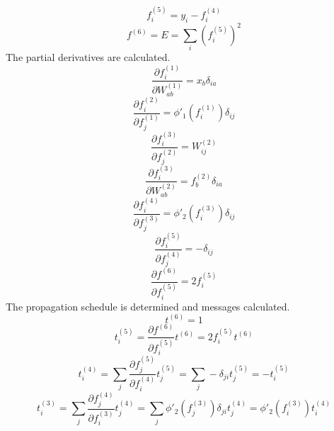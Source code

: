 \documentclass[fleqn]{article}
\begin{document}
\begin{equation}
    f^{(5)}_i = y_i - f^{(4)}_i
\end{equation}
\begin{equation}
    f^{(6)} = E = \sum_i \left ( f^{(5)}_i \right )^2
\end{equation}
The partial derivatives are calculated.
\begin{equation}
    \frac{\partial f^{(1)}_i}{\partial W^{(1)}_{ab}} = x_b \delta_{ia}
\end{equation}
\begin{equation}
    \frac{\partial f^{(2)}_i}{\partial f^{(1)}_j} = \phi'_1 \left ( f^{(1)}_i \right ) \delta_{ij}
\end{equation}
\begin{equation}
    \frac{\partial f^{(3)}_i}{\partial f^{(2)}_j} = W^{(2)}_{ij}
\end{equation}
\begin{equation}
    \frac{\partial f^{(3)}_i}{\partial W^{(2)}_{ab}} = f^{(2)}_b \delta_{ia}
\end{equation}
\begin{equation}
    \frac{\partial f^{(4)}_i}{\partial f^{(3)}_j} = \phi'_2 \left ( f^{(3)}_i \right ) \delta_{ij}
\end{equation}
\begin{equation}
    \frac{\partial f^{(5)}_i}{\partial f^{(4)}_j} = - \delta_{ij}
\end{equation}
\begin{equation}
    \frac{\partial f^{(6)}}{\partial f^{(5)}_i} = 2 f^{(5)}_i
\end{equation}
The propagation schedule is determined and messages calculated.
\begin{equation}
    t^{(6)} = 1
\end{equation}
\begin{equation}
    t^{(5)}_i = \frac{\partial f^{(6)}}{\partial f^{(5)}_i} t^{(6)} = 2 f^{(5)}_i t^{(6)}
\end{equation}
\begin{equation}
    t^{(4)}_i = \sum_j \frac{\partial f^{(5)}_j}{\partial f^{(4)}_i} t^{(5)}_j = \sum_j - \delta_{ji} t^{(5)}_j = - t^{(5)}_i
\end{equation}
\begin{equation}
    t^{(3)}_i = \sum_j \frac{\partial f^{(4)}_j}{\partial f^{(3)}_i} t^{(4)}_j = \sum_j \phi'_2 \left ( f^{(3)}_j \right ) \delta_{ji} t^{(4)}_j = \phi'_2 \left ( f^{(3)}_i \right ) t^{(4)}_i
\end{equation}
\end{document}
